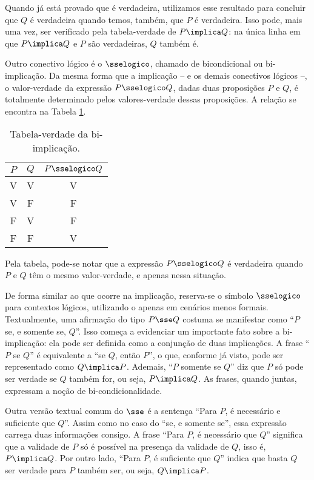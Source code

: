 Quando já está provado que  é verdadeira, utilizamos esse resultado para concluir que $Q$ é verdadeira quando temos, também, que $P$ é verdadeira. Isso pode, mais uma vez, ser verificado pela tabela-verdade de $P \implica Q$: na única linha em que $P \implica Q$ e $P$ são verdadeiras, $Q$ também é.

Outro conectivo lógico é o $\sselogico$, chamado de bicondicional ou bi-implicação.
Da mesma forma que a implicação -- e os demais conectivos lógicos --, o valor-verdade da expressão $P \sselogico Q$, dadas duas proposições $P$ e $Q$, é totalmente determinado pelos valores-verdade dessas proposições.
A relação se encontra na Tabela \ref{tbl:bi-implicacao}.

\begin{table}[h]
	\centering
	\begin{tabular}{cc|c}
		$P$		& $Q$		& $P \sselogico Q$	\\ \hline
		V		& V			& V			\\
		V		& F			& F			\\
		F		& V			& F			\\
		F		& F			& V			\\	
	\end{tabular}
	\caption{Tabela-verdade da bi-implicação.}
	\label{tbl:bi-implicacao}
\end{table}

Pela tabela, pode-se notar que a expressão $P \sselogico Q$ é verdadeira quando $P$ e $Q$ têm o mesmo valor-verdade, e apenas nessa situação.

De forma similar ao que ocorre na implicação, reserva-se o símbolo $\sselogico$ para contextos lógicos, utilizando o \entreaspas{$\sse$} apenas em cenários menos formais. Textualmente, uma afirmação do tipo $P \sse Q$ costuma se manifestar como ``$P$ se, e somente se, $Q$''. Isso começa a evidenciar um importante fato sobre a bi-implicação: ela pode ser definida como a conjunção de duas implicações. A frase ``$P$ se $Q$'' é equivalente a ``se $Q$, então $P$'', o que, conforme já visto, pode ser representado como $Q \implica P$. Ademais, ``$P$ somente se $Q$'' diz que $P$ só pode ser verdade se $Q$ também for, ou seja, $P \implica Q$. As frases, quando juntas, expressam a noção de bi-condicionalidade.

Outra versão textual comum do $\sse$ é a sentença ``Para $P$, é necessário e suficiente que $Q$''. Assim como no caso do ``se, e somente se'', essa expressão carrega duas informações consigo. A frase ``Para $P$, é necessário que $Q$'' significa que a validade de $P$ só é possível na presença da validade de $Q$, isso é, $P \implica Q$. Por outro lado, ``Para $P$, é suficiente que $Q$'' indica que basta $Q$ ser verdade para $P$ também ser, ou seja, $Q \implica P$.

